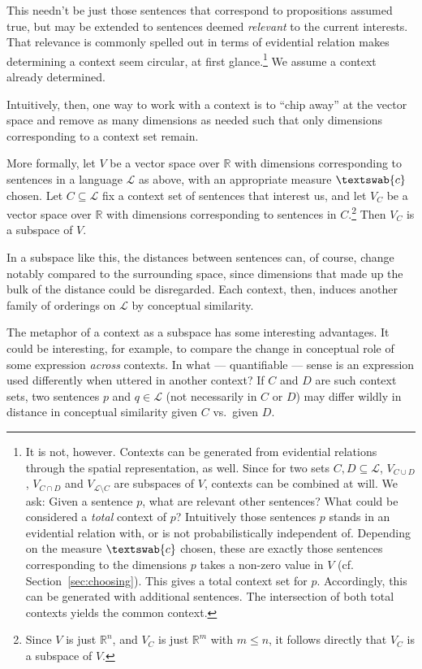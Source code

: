 \documentclass[11pt, a4paper]{scrartcl}
\renewcommand{\i}[1]{\emph{#1}}
\renewcommand{\L}{\mathcal{L}}
\newcommand{\m}[1]{\textswab{#1}}
\begin{document}
This needn't be just those sentences that correspond to propositions assumed true, but may be extended to sentences deemed \i{relevant} to the current interests. That relevance is commonly spelled out in terms of evidential relation makes determining a context seem circular, at first glance.\footnote{It is not, however. Contexts can be generated from evidential relations through the spatial representation, as well. Since for two sets $C, D \subseteq \L$, $V_{C\cup D}$, $V_{C\cap D}$ and $V_{\L\setminus C}$ are subspaces of $V$, contexts can be combined at will. We ask: Given a sentence $p$, what are relevant other sentences? What could be considered a \i{total} context of $p$? Intuitively those sentences $p$ stands in an evidential relation with, or is not probabilistically independent of. Depending on the measure $\m{c}$ chosen, these are exactly those sentences corresponding to the dimensions $p$ takes a non-zero value in $V$ (cf. Section~\ref{sec:choosing}). This gives a total context set for $p$. Accordingly, this can be generated with additional sentences. The intersection of both total contexts yields the common context.} We assume a context already determined.

Intuitively, then, one way to work with a context is to ``chip away'' at the vector space and remove as many dimensions as needed such that only dimensions corresponding to a context set remain.

More formally, let $V$ be a vector space over $\mathbb{R}$ with dimensions corresponding to sentences in a language $\L$ as above, with an appropriate measure $\m{c}$ chosen. Let $C \subseteq \L$ fix a context set of sentences that interest us, and let $V_C$ be a vector space over $\mathbb{R}$ with dimensions corresponding to sentences in $C$.\footnote{Since $V$ is just $\mathbb{R}^n$, and $V_C$ is just $\mathbb{R}^m$ with $m \leqslant n$, it follows directly that $V_C$ is a subspace of $V$.} Then $V_C$ is a subspace of $V$.

In a subspace like this, the distances between sentences can, of course, change notably compared to the surrounding space, since dimensions that made up the bulk of the distance could be disregarded. Each context, then, induces another family of orderings on $\L$ by conceptual similarity.

The metaphor of a context as a subspace has some interesting advantages. It could be interesting, for example, to compare the change in conceptual role of some expression \i{across} contexts. In what --- quantifiable --- sense is an expression used differently when uttered in another context? If $C$ and $D$ are such context sets, two sentences $p$ and $q \in \L$  (not necessarily in $C$ or $D$) may differ wildly in distance in conceptual similarity given $C$ vs.\ given $D$. 
\end{document}
